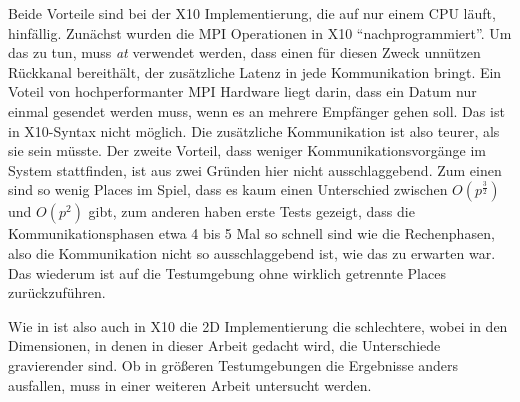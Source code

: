 Beide Vorteile sind bei der X10 Implementierung, die auf nur einem CPU läuft, hinfällig. Zunächst wurden die MPI Operationen in X10 \enquote{nachprogrammiert}. Um das zu tun, muss \textit{at} verwendet werden, dass einen für diesen Zweck unnützen Rückkanal bereithält, der zusätzliche Latenz in jede Kommunikation bringt. Ein Voteil von hochperformanter MPI Hardware liegt darin, dass ein Datum nur einmal gesendet werden muss, wenn es an mehrere Empfänger gehen soll. Das ist in X10-Syntax nicht möglich. Die zusätzliche Kommunikation ist also teurer, als sie sein müsste. 
Der zweite Vorteil, dass weniger Kommunikationsvorgänge im System stattfinden, ist aus zwei Gründen hier nicht ausschlaggebend. Zum einen sind so wenig Places im Spiel, dass es kaum einen Unterschied zwischen $O(p^{\frac{3}{2}})$ und $O(p^2)$ gibt, zum anderen haben erste Tests gezeigt, dass die Kommunikationsphasen etwa 4 bis 5 Mal so schnell sind wie die Rechenphasen, also die Kommunikation nicht so ausschlaggebend ist, wie das zu erwarten war. Das wiederum ist auf die Testumgebung ohne wirklich getrennte Places zurückzuführen.

Wie in \cite{Buluc:2011} ist also auch in X10 die 2D Implementierung die schlechtere, wobei in den Dimensionen, in denen in dieser Arbeit gedacht wird, die Unterschiede gravierender sind. Ob in größeren Testumgebungen die Ergebnisse anders ausfallen, muss in einer weiteren Arbeit untersucht werden.


